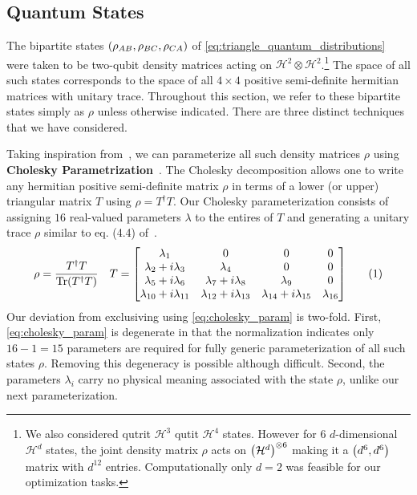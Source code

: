 \documentclass[aps, 10pt, english, twoside, pra, nofootinbib, longbibliography]{revtex4-1}
\theoremstyle{plain}
\theoremstyle{definition}
\theoremstyle{remark}
\newcommand{\Hilb}{\mathcal{H}}
\newcommand{\term}[1]{\textcolor{Mahogany}{\textbf{#1}}}
\begin{document}
    \subsection{Quantum States}
    The bipartite states $\br{\rho_{AB}, \rho_{BC}, \rho_{CA}}$ of \cref{eq:triangle_quantum_distributions} were taken to be two-qubit density matrices acting on $\Hilb^2 \otimes \Hilb^2$.\footnote{We also considered qutrit $\Hilb^3$ qutit $\Hilb^4$ states. However for $6$ $d$-dimensional $\Hilb^d$ states, the joint density matrix $\rho$ acts on $\br{\Hilb^d}^{\otimes 6}$ making it a $\br{d^6, d^6}$ matrix with $d^{12}$ entries. Computationally only $d = 2$ was feasible for our optimization tasks.} The space of all such states corresponds to the space of all $4\times 4$ positive semi-definite hermitian matrices with unitary trace. Throughout this section, we refer to these bipartite states simply as $\rho$ unless otherwise indicated. There are three distinct techniques that we have considered.

    Taking inspiration from~\cite{James_2001}, we can parameterize all such density matrices $\rho$ using \term{Cholesky Parametrization}~\cite{Grasmair_2014}. The Cholesky decomposition allows one to write any hermitian positive semi-definite matrix $\rho$ in terms of a lower (or upper) triangular matrix $T$ using $\rho = T^\dagger T$. Our Cholesky parameterization consists of assigning $16$ real-valued parameters $\lambda$ to the entires of $T$ and generating a unitary trace $\rho$ similar to eq. (4.4) of~\cite{James_2001}.
    \[ \rho = \f{T^\dagger T}{\Tr\br{T^\dagger T}} \quad T = \pmtrx{\la_{1}&0&0&0\\\la_{2} + i \la_{3}&\la_{4}&0&0\\\la_{5} + i \la_{6}&\la_{7} + i \la_{8}&\la_{9}&0\\\la_{10} + i \la_{11}&\la_{12} + i \la_{13}&\la_{14} + i \la_{15}&\la_{16}} \eq \label{eq:cholesky_param} \]
    Our deviation from exclusiving using \cref{eq:cholesky_param} is two-fold. First, \cref{eq:cholesky_param} is degenerate in that the normalization indicates only $16 - 1 = 15$ parameters are required for fully generic parameterization of all such states $\rho$. Removing this degeneracy is possible although difficult. Second, the parameters $\lambda_i$ carry no physical meaning associated with the state $\rho$, unlike our next parameterization.
\end{document}
